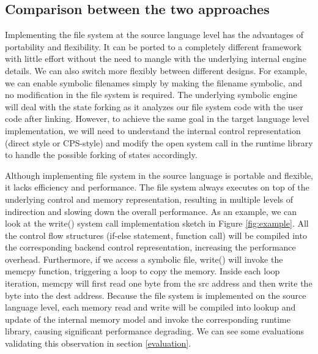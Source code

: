 \documentclass[sigplan, nonacm]{acmart}\settopmatter{printfolios=true,printccs=false,printacmref=false}
\begin{document}
\subsection*{Comparison between the two approaches}
Implementing the file system at the source language level has the advantages of portability and flexibility. It can be ported to a completely different framework with little effort without the need to mangle with the underlying internal engine details. We can also switch more flexibly between different designs. For example, we can enable symbolic filenames simply by making the filename symbolic, and no modification in the file system is required. The underlying symbolic engine will deal with the state forking as it analyzes our file system code with the user code after linking. However, to achieve the same goal in the target language level implementation, we will need to understand the internal control representation (direct style or CPS-style) and modify the open system call in the runtime library to handle the possible forking of states accordingly.\par
Although implementing file system in the source language is portable and flexible, it lacks efficiency and performance. The file system always executes on top of the underlying control and memory representation, resulting in multiple levels of indirection and slowing down the overall performance. As an example, we can look at the write() system call implementation sketch in Figure \ref{fig:example}. All the control flow structures (if-else statement, function call) will be compiled into the corresponding backend control representation, increasing the performance overhead. Furthermore, if we access a symbolic file, write() will invoke the memcpy function, triggering a loop to copy the memory. Inside each loop iteration, memcpy will first read one byte from the src address and then write the byte into the dest address. Because the file system is implemented on the source language level, each memory read and write will be compiled into lookup and update of the internal memory model and invoke the corresponding runtime library, causing significant performance degrading. We can see some evaluations validating this observation in section \ref{evaluation}.
\end{document}
